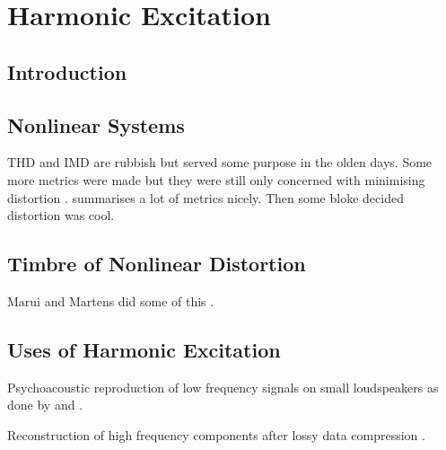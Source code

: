 
\chapter{Harmonic Excitation}
\label{chap:Excitation}

\section{Introduction}
\label{sec:Excitation-Introduction}

\section{Nonlinear Systems}
\label{sec:Excitation-NonlinearSystems}
	\note
	{
		THD and IMD are rubbish but served some purpose in the olden days. Some more metrics were made but they were still only concerned with minimising distortion \citep{lee2003auditory, geddes2003auditory, tan2004predicting}. \citet{voishvillo2006assessment} summarises a lot of metrics nicely. Then some bloke decided distortion was cool.
	}

\section{Timbre of Nonlinear Distortion}
\label{sec:Excitation-Timbre}
	\note
	{
		Marui and Martens did some of this \citep{marui2005timbre, marui2005constructing, marui2005predicting}.
	}

\section{Uses of Harmonic Excitation}
\label{sec:Excitation-Uses}
	\note
	{
		Psychoacoustic reproduction of low frequency signals on small loudspeakers as done by \citet{larsen2002reproducing} and \citet{gan2001virtual}.

		Reconstruction of high frequency components after lossy data compression \citep{friedrich2007spectral, nagel2009a, nagel2010a, valin2000bandwidth, dietz2002spectral, larsen2002efficient, sha2010high}.
	}

